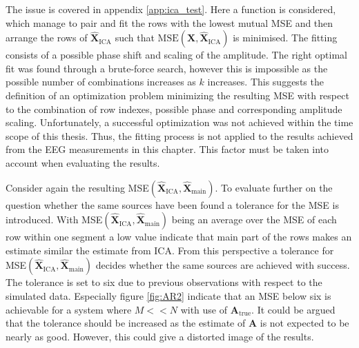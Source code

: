 The issue is covered in appendix \ref{app:ica_test}. 
Here a function is considered, which manage to pair and fit the rows with the lowest mutual MSE and then arrange the rows of $\hat{\mathbf{X}}_{\text{ICA}}$ such that $\text{MSE}(\mathbf{X}, \hat{\textbf{X}}_{\text{ICA}})$ is minimised. 
The fitting consists of a possible phase shift and scaling of the amplitude. 
The right optimal fit was found through a brute-force search, however this is impossible as the possible number of combinations increases as $k$ increases. 
This suggests the definition of an optimization problem minimizing the resulting MSE with respect to the combination of row indexes, possible phase and corresponding amplitude scaling. 
Unfortunately, a successful optimization was not achieved within the time scope of this thesis.
Thus, the fitting process is not applied to the results achieved from the EEG measurements in this chapter. 
This factor must be taken into account when evaluating the results.

Consider again the resulting MSE$(\hat{\mathbf{X}}_{\text{ICA}}, \hat{\mathbf{X}}_{\text{main}})$. 
To evaluate further on the question whether the same sources have been found a tolerance for the MSE is introduced. 
With MSE$(\hat{\mathbf{X}}_{\text{ICA}}, \hat{\mathbf{X}}_{\text{main}})$ being an average over the MSE of each row within one segment a low value indicate that main part of the rows makes an estimate similar the estimate from ICA. 
From this perspective a tolerance for MSE$(\hat{\mathbf{X}}_{\text{ICA}}, \hat{\mathbf{X}}_{\text{main}})$ decides whether the same sources are achieved with success. 
The tolerance is set to six due to previous observations with respect to the simulated data. Especially figure \ref{fig:AR2} indicate that an MSE below six is achievable for a system where $M << N$ with use of $\mathbf{A}_{\text{true}}$. 
It could be argued that the tolerance should be increased as the estimate of $\mathbf{A}$ is not expected to be nearly as good. 
However, this could give a distorted image of the results.    

